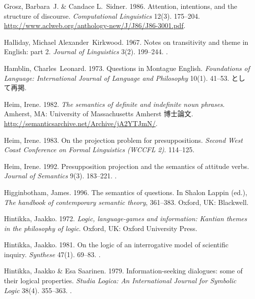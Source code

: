 \documentclass{goken}
\begin{document}
\begin{thebibliography}{74}
	Grosz, Barbara~J. \& Candace L.~Sidner. 1986.
\newblock Attention, intentions, and the structure of discourse.
\newblock \emph{Computational Linguistics} 12(3). 175--204.
\newblock
  \urlprefix\url{http://www.aclweb.org/anthology-new/J/J86/J86-3001.pdf}.

Halliday, Michael Alexander~Kirkwood. 1967.
\newblock Notes on transitivity and theme in {E}nglish: part 2.
\newblock \emph{Journal of Linguistics} 3(2). 199--244.
\newblock {}.

Hamblin, Charles~Leonard. 1973.
\newblock Questions in {M}ontague {E}nglish.
\newblock \emph{Foundations of Language: International Journal of Language and
  Philosophy} 10(1). 41--53.
\newblock \citet[247--259]{Partee1976}として再掲.

Heim, Irene. 1982.
\newblock \emph{The semantics of definite and indefinite noun phrases}.
\newblock Amherst, MA: University of Massachusetts Amherst 博士論文.
\newblock \urlprefix\url{http://semanticsarchive.net/Archive/jA2YTJmN/}.

Heim, Irene. 1983.
\newblock On the projection problem for presuppositions.
\newblock \emph{Second West Coast Conference on Formal Linguistics (WCCFL
  2)}. 114--125.

Heim, Irene. 1992.
\newblock Presupposition projection and the semantics of attitude verbs.
\newblock \emph{Journal of Semantics} 9(3). 183--221.
\newblock {}.

Higginbotham, James. 1996.
\newblock The semantics of questions.
\newblock In Shalon Lappin (ed.), \emph{The handbook of contemporary semantic
  theory}, 361--383. Oxford, UK: Blackwell.

Hintikka, Jaakko. 1972.
\newblock \emph{Logic, language-games and information: {K}antian themes in the
  philosophy of logic}.
\newblock Oxford, UK: Oxford University Press.

Hintikka, Jaakko. 1981.
\newblock On the logic of an interrogative model of scientific inquiry.
\newblock \emph{Synthese} 47(1). 69--83.
\newblock {}.

Hintikka, Jaakko \& Esa Saarinen. 1979.
\newblock Information-seeking dialogues: some of their logical properties.
\newblock \emph{Studia Logica: An International Journal for Symbolic Logic} 38(4). 355--363.
\newblock {}.


\end{thebibliography}
\end{document}
